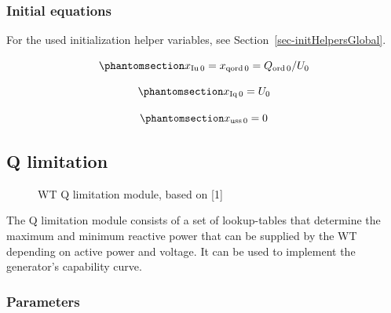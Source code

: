 \documentclass[
  a4paper,
  DIV=11,
  numbers=noendperiod]{scrartcl}
\begin{document}
\subsubsection{Initial equations}\label{initial-equations-1}

For the used initialization helper variables, see
Section~\ref{sec-initHelpersGlobal}.

\begin{equation}\phantomsection\label{eq-initXiu}{
x_\mathrm{Iu\,0} = x_\mathrm{qord\,0} = Q_\mathrm{ord\,0}/U_\mathrm{0}
}\end{equation}

\begin{equation}\phantomsection\label{eq-initXiq}{
x_\mathrm{Iq\,0} = U_\mathrm{0}
}\end{equation}

\begin{equation}\phantomsection\label{eq-initXuss}{
x_\mathrm{uss\,0} = 0
}\end{equation}

\subsection{Q limitation}\label{q-limitation}

\begin{figure}


\caption{\label{fig-WTQLim}WT Q limitation module, based on {[}1{]}}

\end{figure}%

The Q limitation module consists of a set of lookup-tables that
determine the maximum and minimum reactive power that can be supplied by
the WT depending on active power and voltage. It can be used to
implement the generator's capability curve.

\subsubsection{Parameters}\label{parameters-1}
\end{document}
